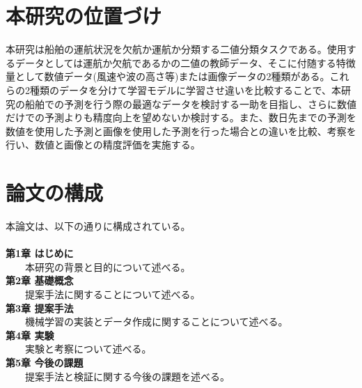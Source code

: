 \section{本研究の位置づけ}
本研究は船舶の運航状況を欠航か運航か分類する二値分類タスクである。使用するデータとしては運航か欠航であるかの二値の教師データ、そこに付随する特徴量として数値データ(風速や波の高さ等)または画像データの2種類がある。これらの2種類のデータを分けて学習モデルに学習させ違いを比較することで、本研究の船舶での予測を行う際の最適なデータを検討する一助を目指し、さらに数値だけでの予測よりも精度向上を望めないか検討する。また、数日先までの予測を数値を使用した予測と画像を使用した予測を行った場合との違いを比較、考察を行い、数値と画像との精度評価を実施する。%





\section{論文の構成}
本論文は、以下の通りに構成されている。
\\
\\
\large{\textbf{第1章 はじめに}}\\
\ \ \ \ 本研究の背景と目的について述べる。\\
\large{\textbf{第2章 基礎概念}}\\
\ \ \ \ 提案手法に関することについて述べる。\\
\large{\textbf{第3章 提案手法}}\\
\ \ \ \ 機械学習の実装とデータ作成に関することについて述べる。\\
\large{\textbf{第4章 実験}}\\
\ \ \ \ 実験と考察について述べる。\\
\large{\textbf{第5章 今後の課題}}\\
\ \ \ \ 提案手法と検証に関する今後の課題を述べる。\\
\normalsize{}


